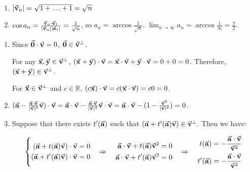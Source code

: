 \begin{exercise}{19}
  \begin{enumerate}
    \item $|\vec{\mathbf{v}}_n| = \sqrt{1 + \hdots + 1} = \sqrt{n}$
    \item $\cos{a_n} = \frac{\vec{\mathbf{v}}_n \cdot \vec{\mathbf{e}}_1}{|\vec{\mathbf{v}}_n||\vec{\mathbf{e}}_1|} = \frac{1}{\sqrt{n}}$, so $a_n = \arccos{\frac{1}{\sqrt{n}}}$. $\lim_{n \to \infty} a_n = \arccos{\frac{1}{\infty}} = \frac{\pi}{2}$.
  \end{enumerate}
\end{exercise}

\begin{exercise}{24}
  \def \Set {\Vect{v}^{\bot}}
  \begin{enumerate}
    \item Since $\vec{\mathbf{0}} \cdot \vec{\mathbf{v}} = 0$, $\Vect{0} \in \Set$.
    
          For any $\Vect{x}, \Vect{y} \in \Set$, $(\vec{\mathbf{x}} + \vec{\mathbf{y}}) \cdot \vec{\mathbf{v}} = \vec{\mathbf{x}} \cdot \vec{\mathbf{v}} + \vec{\mathbf{y}} \cdot \vec{\mathbf{v}} = 0 + 0 = 0$. Therefore, $(\Vect{x} + \Vect{y}) \in \Set$.
          
          For $\Vect{x} \in \Set$ and $c \in \mathbb{R}$, $(c\vec{\mathbf{x}}) \cdot \vec{\mathbf{v}} = c(\vec{\mathbf{x}} \cdot \vec{\mathbf{v}}) = c0 = 0$. \rQED
    
    \item $(\vec{\mathbf{a}} - \frac{\vec{\mathbf{a}} \cdot \vec{\mathbf{v}}}{|\vec{\mathbf{v}}|^2}\vec{\mathbf{v}}) \cdot \vec{\mathbf{v}} =
            \vec{\mathbf{a}} \cdot \vec{\mathbf{v}} - \frac{\vec{\mathbf{a}}\cdot\vec{\mathbf{v}}}{|\vec{\mathbf{v}}|^2}\vec{\mathbf{v}} \cdot \vec{\mathbf{v}} =
            \vec{\mathbf{a}} \cdot \vec{\mathbf{v}} - (1 - \frac{\vec{\mathbf{v}}^2}{|\vec{\mathbf{v}}|^2}) = 0$. \rQED
            
    \item Suppose that there exists $t'(\vec{\mathbf{a}})$ such that $(\Vect{a} + t'(\Vect{a})\Vect{v}) \in \Set$. Then we have:
    
         $$\left\{
         \begin{aligned}
            (\vec{\mathbf{a}} + t(\vec{\mathbf{a}})\vec{\mathbf{v}}) \cdot \vec{\mathbf{v}} = 0 \\
            (\vec{\mathbf{a}} + t'(\vec{\mathbf{a}})\vec{\mathbf{v}}) \cdot \vec{\mathbf{v}} = 0
         \end{aligned} \quad \Rightarrow \quad
         \begin{aligned}
            \vec{\mathbf{a}} \cdot \vec{\mathbf{v}} + t(\vec{\mathbf{a}})\vec{\mathbf{v}}^2 = 0 \\
            \vec{\mathbf{a}} \cdot \vec{\mathbf{v}} + t'(\vec{\mathbf{a}})\vec{\mathbf{v}}^2 = 0
         \end{aligned} \quad \Rightarrow \quad 
         \begin{aligned}
            t(\vec{\mathbf{a}}) = -\frac{\vec{\mathbf{a}} \cdot \vec{\mathbf{v}}}{\vec{\mathbf{v}}^2} \\
            t'(\vec{\mathbf{a}}) = -\frac{\vec{\mathbf{a}} \cdot \vec{\mathbf{v}}}{\vec{\mathbf{v}}^2}
         \end{aligned}
         \right.$$
         

\end{enumerate}
\end{exercise}

